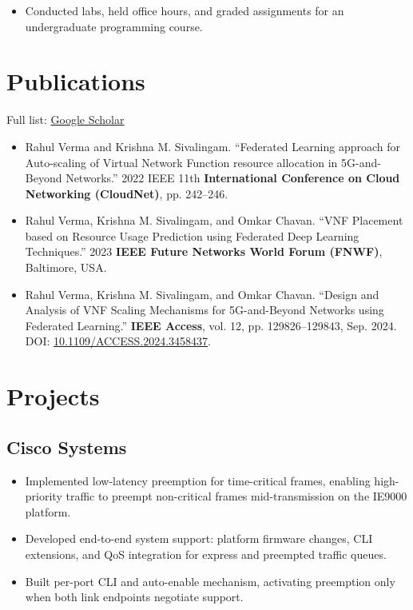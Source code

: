 \documentclass{resume}
\begin{document}
\begin{itemize}\setlength{\itemsep}{0pt}\setlength{\parskip}{0pt}
    \item Conducted labs, held office hours, and graded assignments for an undergraduate programming course.
\end{itemize}

\section{Publications}
{\small Full list: \href{https://scholar.google.com/citations?user=pDZcIpoAAAAJ&hl=en}{Google Scholar}}
\begin{itemize}\setlength{\itemsep}{2pt}\setlength{\parskip}{0pt}
    \item Rahul Verma and Krishna M. Sivalingam. ``Federated Learning approach for Auto-scaling of Virtual Network Function resource allocation in 5G-and-Beyond Networks.'' 2022 IEEE 11th \textbf{International Conference on Cloud Networking (CloudNet)}, pp. 242--246.
    \item Rahul Verma, Krishna M. Sivalingam, and Omkar Chavan. ``VNF Placement based on Resource Usage Prediction using Federated Deep Learning Techniques.'' 2023 \textbf{IEEE Future Networks World Forum (FNWF)}, Baltimore, USA.
    \item Rahul Verma, Krishna M. Sivalingam, and Omkar Chavan. ``Design and Analysis of VNF Scaling Mechanisms for 5G-and-Beyond Networks using Federated Learning.'' \textbf{IEEE Access}, vol. 12, pp. 129826--129843, Sep. 2024. DOI: \href{https://doi.org/10.1109/ACCESS.2024.3458437}{10.1109/ACCESS.2024.3458437}.
\end{itemize}

\section{Projects}

\subsection{Cisco Systems}

\begin{itemize}\setlength{\itemsep}{0pt}\setlength{\parskip}{0pt}
    \item Implemented low-latency preemption for time-critical frames, enabling high-priority traffic to preempt non-critical frames mid-transmission on the IE9000 platform.
    \item Developed end-to-end system support: platform firmware changes, CLI extensions, and QoS integration for express and preempted traffic queues.
    \item Built per-port CLI and auto-enable mechanism, activating preemption only when both link endpoints negotiate support.
\end{itemize}
\end{document}

